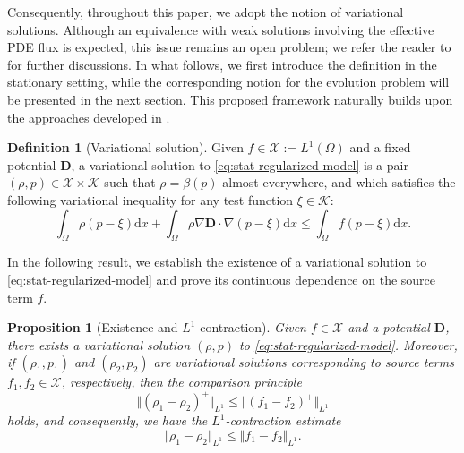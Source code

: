 \documentclass[final,reqno]{amsart}
\theoremstyle{plain}
\newtheorem{proposition}{Proposition}	%
\theoremstyle{definition}
\newtheorem{definition}{Definition}	%
\theoremstyle{remark}
\numberwithin{remark}{section}	%
\numberwithin{example}{section}	%
\newcommand{\de}{\mathbf{D}}
\newcommand{\K}{\mathcal K}
\newcommand{\Om}{\Omega}
\newcommand{\dd}{\mathrm{d}}
\newcommand{\X}{\mathcal{X}}
\begin{document}
Consequently, throughout this paper, we adopt the notion of variational solutions. Although an equivalence with weak solutions involving the effective PDE flux is expected, this issue remains an open problem; we refer the reader to \cite{IgUrbano} for further discussions. In what follows, we first introduce the definition in the stationary setting, while the corresponding notion for the evolution problem will be presented in the next section. This proposed framework naturally builds upon the approaches developed in \cite{MCIg, IgUrbano}.
\begin{definition}[Variational solution]\label{def:var-sol}
     Given $f \in \X:=L^{1}(\Om)$ and a fixed potential $\de$, a variational solution to \eqref{eq:stat-regularized-model} is a pair $(\rho,p) \in \X \times \K$ such that $\rho = \beta(p)$ almost everywhere, and which satisfies the following variational inequality for any test function $\xi \in \K$:
    \begin{equation}
        \int_{\Om} \rho (p-\xi) \dd x + \int_{\Omega} \rho\nabla\de\cdot\nabla(p-\xi)\dd x \leq \int_{\Om} f(p-\xi)\dd x.
    \end{equation}
\end{definition}
In the following result, we establish the existence of a variational solution to \eqref{eq:stat-regularized-model} and prove its continuous dependence on the source term $f$.
\begin{proposition}[Existence and $L^1$-contraction]\label{prop:existence-stat}
     Given $f \in \X$ and a potential $\de$, there exists a variational solution $(\rho,p)$ to \eqref{eq:stat-regularized-model}. Moreover, if $(\rho_1, p_1)$ and $(\rho_2, p_2)$ are variational solutions corresponding to source terms $f_1, f_2 \in \X$, respectively, then the comparison principle 
    \begin{equation}\label{eq:est-1}
        \Vert (\rho_1 - \rho_2)^{+} \Vert_{L^1} \leq \Vert (f_1 - f_2)^{+} \Vert_{L^1}
    \end{equation}
    holds, and consequently, we have the $L^1$-contraction estimate
    \begin{equation}\label{eq:est-2}
        \Vert \rho_1 - \rho_2 \Vert_{L^1} \leq \Vert f_1 - f_2 \Vert_{L^1}.
    \end{equation}
\end{proposition}
\end{document}
